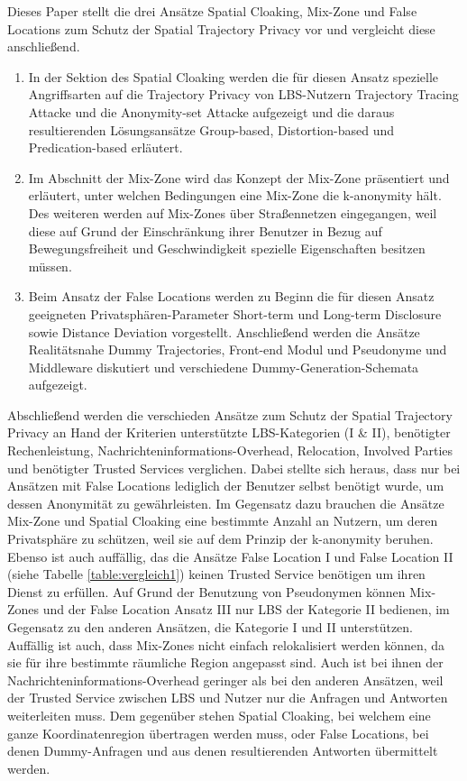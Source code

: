 Dieses Paper stellt die drei Ansätze Spatial Cloaking, Mix-Zone und False Locations zum Schutz der Spatial Trajectory Privacy vor und vergleicht diese anschließend.
\begin{enumerate}
	\item In der Sektion des Spatial Cloaking werden die für diesen Ansatz spezielle Angriffsarten auf die Trajectory Privacy von LBS-Nutzern Trajectory Tracing Attacke und die Anonymity-set Attacke aufgezeigt und die daraus resultierenden Lösungsansätze Group-based, Distortion-based und Predication-based erläutert.
	\item Im Abschnitt der Mix-Zone wird das Konzept der Mix-Zone präsentiert und erläutert, unter welchen Bedingungen eine Mix-Zone die k-anonymity hält. Des weiteren werden auf Mix-Zones über Straßennetzen eingegangen, weil diese auf Grund der Einschränkung ihrer Benutzer in Bezug auf Bewegungsfreiheit und Geschwindigkeit spezielle Eigenschaften besitzen müssen.
	\item Beim Ansatz der False Locations werden zu Beginn die für diesen Ansatz geeigneten Privatsphären-Parameter Short-term und Long-term Disclosure sowie Distance Deviation vorgestellt. Anschließend werden die Ansätze Realitätsnahe Dummy Trajectories, Front-end Modul und Pseudonyme und Middleware diskutiert und verschiedene Dummy-Generation-Schemata aufgezeigt.
\end{enumerate}
Abschließend werden die verschieden Ansätze zum Schutz der Spatial Trajectory Privacy an Hand der Kriterien unterstützte LBS-Kategorien (I \& II), benötigter Rechenleistung, Nachrichteninformations-Overhead, Relocation, Involved Parties und benötigter Trusted Services verglichen. Dabei stellte sich heraus, dass nur bei Ansätzen mit False Locations lediglich der Benutzer selbst benötigt wurde, um dessen Anonymität zu gewährleisten. Im Gegensatz dazu brauchen die Ansätze Mix-Zone und Spatial Cloaking eine bestimmte Anzahl an Nutzern, um deren Privatsphäre zu schützen, weil sie auf dem Prinzip der k-anonymity beruhen. Ebenso ist auch auffällig, das die Ansätze False Location I und False Location II (siehe Tabelle \ref{table:vergleich1}) keinen Trusted Service benötigen um ihren Dienst zu erfüllen. Auf Grund der Benutzung von Pseudonymen können Mix-Zones und der False Location Ansatz III nur LBS der Kategorie II bedienen, im Gegensatz zu den anderen Ansätzen, die Kategorie I und II unterstützen. Auffällig ist auch, dass Mix-Zones nicht einfach relokalisiert werden können, da sie für ihre bestimmte räumliche Region angepasst sind. Auch ist bei ihnen der Nachrichteninformations-Overhead geringer als bei den anderen Ansätzen, weil der Trusted Service zwischen LBS und Nutzer nur die Anfragen und Antworten weiterleiten muss. Dem gegenüber stehen Spatial Cloaking, bei welchem eine ganze Koordinatenregion übertragen werden muss, oder False Locations, bei denen Dummy-Anfragen und aus denen resultierenden Antworten übermittelt werden.    